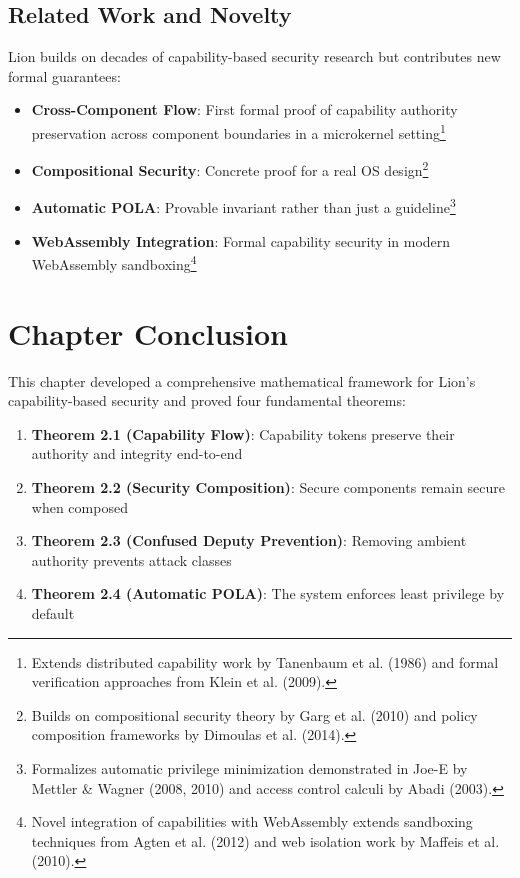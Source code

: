 \subsection{Related Work and Novelty}

Lion builds on decades of capability-based security research but contributes new formal guarantees:

\begin{itemize}
\item \textbf{Cross-Component Flow}: First formal proof of capability authority preservation across component boundaries in a microkernel setting\footnote{Extends distributed capability work by Tanenbaum et al. (1986) and formal verification approaches from Klein et al. (2009).}
\item \textbf{Compositional Security}: Concrete proof for a real OS design\footnote{Builds on compositional security theory by Garg et al. (2010) and policy composition frameworks by Dimoulas et al. (2014).}
\item \textbf{Automatic POLA}: Provable invariant rather than just a guideline\footnote{Formalizes automatic privilege minimization demonstrated in Joe-E by Mettler \& Wagner (2008, 2010) and access control calculi by Abadi (2003).}
\item \textbf{WebAssembly Integration}: Formal capability security in modern WebAssembly sandboxing\footnote{Novel integration of capabilities with WebAssembly extends sandboxing techniques from Agten et al. (2012) and web isolation work by Maffeis et al. (2010).}
\end{itemize}

\newpage

\section{Chapter Conclusion}

This chapter developed a comprehensive mathematical framework for Lion's capability-based security and proved four fundamental theorems:

\begin{enumerate}
\item \textbf{Theorem 2.1 (Capability Flow)}: Capability tokens preserve their authority and integrity end-to-end
\item \textbf{Theorem 2.2 (Security Composition)}: Secure components remain secure when composed
\item \textbf{Theorem 2.3 (Confused Deputy Prevention)}: Removing ambient authority prevents attack classes
\item \textbf{Theorem 2.4 (Automatic POLA)}: The system enforces least privilege by default
\end{enumerate}

